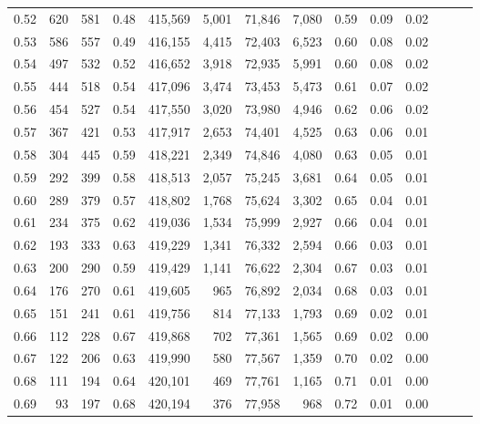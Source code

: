 \begin{tabular}{rrrrrrrrrrrrrr}
0.52 &     620 &    581 &  0.48 &  415,569 &    5,001 &  71,846 &   7,080 &  0.59 &  0.09 &      0.02 \\
0.53 &     586 &    557 &  0.49 &  416,155 &    4,415 &  72,403 &   6,523 &  0.60 &  0.08 &      0.02 \\
0.54 &     497 &    532 &  0.52 &  416,652 &    3,918 &  72,935 &   5,991 &  0.60 &  0.08 &      0.02 \\
0.55 &     444 &    518 &  0.54 &  417,096 &    3,474 &  73,453 &   5,473 &  0.61 &  0.07 &      0.02 \\
0.56 &     454 &    527 &  0.54 &  417,550 &    3,020 &  73,980 &   4,946 &  0.62 &  0.06 &      0.02 \\
0.57 &     367 &    421 &  0.53 &  417,917 &    2,653 &  74,401 &   4,525 &  0.63 &  0.06 &      0.01 \\
0.58 &     304 &    445 &  0.59 &  418,221 &    2,349 &  74,846 &   4,080 &  0.63 &  0.05 &      0.01 \\
0.59 &     292 &    399 &  0.58 &  418,513 &    2,057 &  75,245 &   3,681 &  0.64 &  0.05 &      0.01 \\
0.60 &     289 &    379 &  0.57 &  418,802 &    1,768 &  75,624 &   3,302 &  0.65 &  0.04 &      0.01 \\
0.61 &     234 &    375 &  0.62 &  419,036 &    1,534 &  75,999 &   2,927 &  0.66 &  0.04 &      0.01 \\
0.62 &     193 &    333 &  0.63 &  419,229 &    1,341 &  76,332 &   2,594 &  0.66 &  0.03 &      0.01 \\
0.63 &     200 &    290 &  0.59 &  419,429 &    1,141 &  76,622 &   2,304 &  0.67 &  0.03 &      0.01 \\
0.64 &     176 &    270 &  0.61 &  419,605 &      965 &  76,892 &   2,034 &  0.68 &  0.03 &      0.01 \\
0.65 &     151 &    241 &  0.61 &  419,756 &      814 &  77,133 &   1,793 &  0.69 &  0.02 &      0.01 \\
0.66 &     112 &    228 &  0.67 &  419,868 &      702 &  77,361 &   1,565 &  0.69 &  0.02 &      0.00 \\
0.67 &     122 &    206 &  0.63 &  419,990 &      580 &  77,567 &   1,359 &  0.70 &  0.02 &      0.00 \\
0.68 &     111 &    194 &  0.64 &  420,101 &      469 &  77,761 &   1,165 &  0.71 &  0.01 &      0.00 \\
0.69 &      93 &    197 &  0.68 &  420,194 &      376 &  77,958 &     968 &  0.72 &  0.01 &      0.00 \\

\end{tabular}
